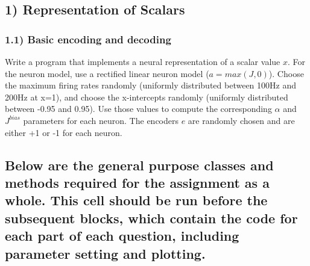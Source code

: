 \documentclass{article}
\begin{document}
    \subsection{1) Representation of
Scalars}\label{representation-of-scalars}

    \subsubsection{1.1) Basic encoding and
decoding}\label{basic-encoding-and-decoding}

Write a program that implements a neural representation of a scalar
value $x$. For the neuron model, use a rectified linear neuron model
($a=max(J,0)$). Choose the maximum firing rates randomly (uniformly
distributed between 100Hz and 200Hz at x=1), and choose the x-intercepts
randomly (uniformly distributed between -0.95 and 0.95). Use those
values to compute the corresponding $\alpha$ and $J^{bias}$ parameters
for each neuron. The encoders $e$ are randomly chosen and are either +1
or -1 for each neuron.

    \subsection{Below are the general purpose classes and methods required
for the assignment as a whole. This cell should be run before the
subsequent blocks, which contain the code for each part of each
question, including parameter setting and
plotting.}\label{below-are-the-general-purpose-classes-and-methods-required-for-the-assignment-as-a-whole.-this-cell-should-be-run-before-the-subsequent-blocks-which-contain-the-code-for-each-part-of-each-question-including-parameter-setting-and-plotting.}
\end{document}
